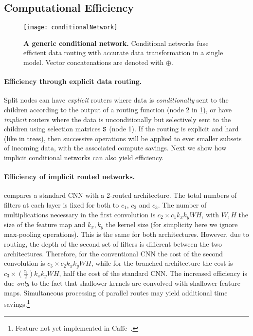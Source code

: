 \documentclass[thesis]{subfiles}
\begin{document}
	\subsection{Computational Efficiency}\label{sec:efficiency}
	
	\begin{figure}[tbp]
	\centerline{
	\texttt{[image: conditionalNetwork]}
	}
	   \caption[A generic conditional network]{{\bf A generic conditional network.} 
	   Conditional networks fuse efficient data routing with accurate data transformation in a single model. 
	   Vector concatenations are denoted with $\oplus$.}
	\label{fig:conditionalNetwork}
	\end{figure}
	
	\paragraph{Efficiency through explicit data routing.}
	Split nodes can have {\em explicit} routers where data is {\em conditionally} sent to the children according to the output of a routing function (\eg node 2 in \cref{fig:conditionalNetwork}),
	or have \emph{implicit} routers where the data is unconditionally but selectively sent to the children using selection matrices $\mat S$ (\eg node 1).
	If the routing is explicit and hard (like in trees), then successive operations will be applied to ever smaller subsets of incoming data, with the associated compute savings. 
	Next we show how implicit conditional networks can also yield efficiency. 
	
	\paragraph{Efficiency of implicit routed networks.}
	 compares a standard CNN with a 2-routed
	architecture. The total numbers of filters at each layer is fixed for 
	both to $c_1$, $c_2$ and $c_3$.
	The number of multiplications necessary in the first convolution is 
	$c_2 \times c_1 k_x k_y W H$, with $W, H$ the size of the feature 
	map and $k_x, k_y$ the kernel size (for simplicity here we ignore max-pooling operations).
	This is the same for both architectures.
	However, due to routing, the depth of the second set of filters is different between the two architectures.
	Therefore, for the conventional CNN the cost of the second convolution is 
	$c_3 \times c_2 k_x k_y W H$, while for the branched architecture 
	the cost is $c_3 \times \left( \frac{c_2}{2}\right) k_x k_y W H$, \ie half the cost of the standard CNN. 
	The increased efficiency is due {\em only} to the fact that shallower kernels are convolved with shallower feature maps. 
	Simultaneous processing of parallel routes may yield additional 
	time savings.\footnote{Feature not yet implemented in Caffe~\cite{Jia2014}.}
	
\end{document}
